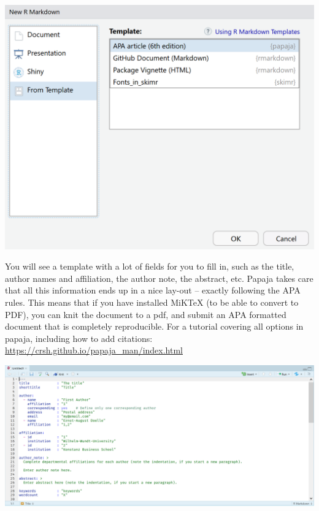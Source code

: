 \documentclass[
  oneside]{book}
\begin{document}
\begin{center}\includegraphics[width=1\linewidth]{images/b4edc7f85821527cd6f98a1c76dfc47d} \end{center}

You will see a template with a lot of fields for you to fill in, such as the
title, author names and affiliation, the author note, the abstract, etc. Papaja
takes care that all this information ends up in a nice lay-out -- exactly
following the APA rules. This means that if you have installed MiKTeX (to be
able to convert to PDF), you can knit the document to a pdf, and submit an APA
formatted document that is completely reproducible. For a tutorial covering all
options in papaja, including how to add citations:
\url{https://crsh.github.io/papaja_man/index.html}

\begin{center}\includegraphics[width=1\linewidth]{images/50d0fc917605c24a8839a66437f9c18b} \end{center}
\end{document}
